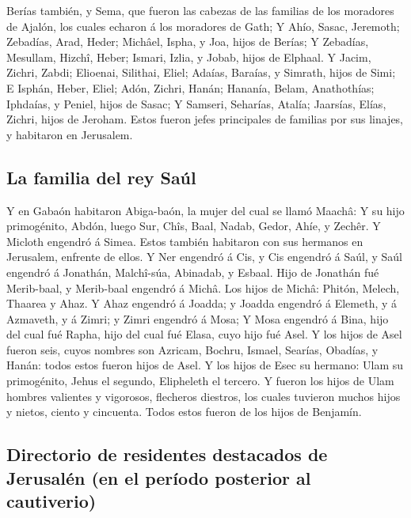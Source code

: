  Berías también, y Sema, que fueron las cabezas de las
familias de los moradores de Ajalón, los cuales echaron á los moradores
de Gath;  Y Ahío, Sasac, Jeremoth;  Zebadías,
Arad, Heder;  Michâel, Ispha, y Joa, hijos de Berías;
 Y Zebadías, Mesullam, Hizchî, Heber;  Ismari,
Izlia, y Jobab, hijos de Elphaal.  Y Jacim, Zichri, Zabdi;
 Elioenai, Silithai, Eliel;  Adaías, Baraías,
y Simrath, hijos de Simi;  E Isphán, Heber, Eliel;
 Adón, Zichri, Hanán;  Hananía, Belam,
Anathothías;  Iphdaías, y Peniel, hijos de Sasac;
 Y Samseri, Seharías, Atalía;  Jaarsías,
Elías, Zichri, hijos de Jeroham.  Estos fueron jefes
principales de familias por sus linajes, y habitaron en Jerusalem.

\hypertarget{la-familia-del-rey-sauxfal}{%
\subsection{La familia del rey Saúl}\label{la-familia-del-rey-sauxfal}}

 Y en Gabaón habitaron Abiga-baón, la mujer del cual se
llamó Maachâ:  Y su hijo primogénito, Abdón, luego Sur,
Chîs, Baal, Nadab,  Gedor, Ahíe, y Zechêr.  Y
Micloth engendró á Simea. Estos también habitaron con sus hermanos en
Jerusalem, enfrente de ellos.  Y Ner engendró á Cis, y Cis
engendró á Saúl, y Saúl engendró á Jonathán, Malchî-súa, Abinadab, y
Esbaal.  Hijo de Jonathán fué Merib-baal, y Merib-baal
engendró á Michâ.  Los hijos de Michâ: Phitón, Melech,
Thaarea y Ahaz.  Y Ahaz engendró á Joadda; y Joadda
engendró á Elemeth, y á Azmaveth, y á Zimri; y Zimri engendró á Mosa;
 Y Mosa engendró á Bina, hijo del cual fué Rapha, hijo del
cual fué Elasa, cuyo hijo fué Asel.  Y los hijos de Asel
fueron seis, cuyos nombres son Azricam, Bochru, Ismael, Searías,
Obadías, y Hanán: todos estos fueron hijos de Asel.  Y los
hijos de Esec su hermano: Ulam su primogénito, Jehus el segundo,
Elipheleth el tercero.  Y fueron los hijos de Ulam hombres
valientes y vigorosos, flecheros diestros, los cuales tuvieron muchos
hijos y nietos, ciento y cincuenta. Todos estos fueron de los hijos de
Benjamín.

\hypertarget{directorio-de-residentes-destacados-de-jerusaluxe9n-en-el-peruxedodo-posterior-al-cautiverio}{%
\subsection{Directorio de residentes destacados de Jerusalén (en el
período posterior al
cautiverio)}\label{directorio-de-residentes-destacados-de-jerusaluxe9n-en-el-peruxedodo-posterior-al-cautiverio}}

